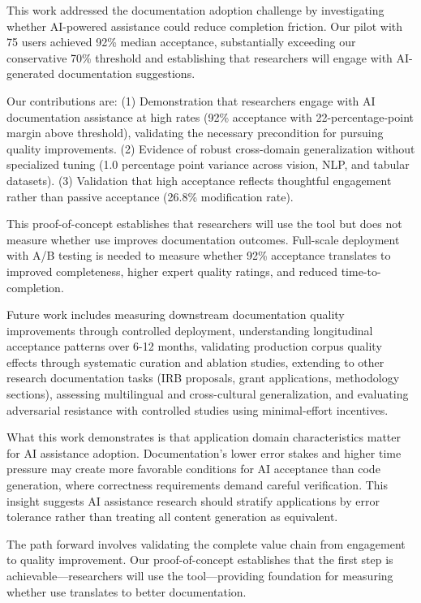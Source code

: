 
This work addressed the documentation adoption challenge by investigating whether AI-powered assistance could reduce completion friction. Our pilot with 75 users achieved 92\% median acceptance, substantially exceeding our conservative 70\% threshold and establishing that researchers will engage with AI-generated documentation suggestions.

Our contributions are: (1) Demonstration that researchers engage with AI documentation assistance at high rates (92\% acceptance with 22-percentage-point margin above threshold), validating the necessary precondition for pursuing quality improvements. (2) Evidence of robust cross-domain generalization without specialized tuning (1.0 percentage point variance across vision, NLP, and tabular datasets). (3) Validation that high acceptance reflects thoughtful engagement rather than passive acceptance (26.8\% modification rate).

This proof-of-concept establishes that researchers will use the tool but does not measure whether use improves documentation outcomes. Full-scale deployment with A/B testing is needed to measure whether 92\% acceptance translates to improved completeness, higher expert quality ratings, and reduced time-to-completion.

Future work includes measuring downstream documentation quality improvements through controlled deployment, understanding longitudinal acceptance patterns over 6-12 months, validating production corpus quality effects through systematic curation and ablation studies, extending to other research documentation tasks (IRB proposals, grant applications, methodology sections), assessing multilingual and cross-cultural generalization, and evaluating adversarial resistance with controlled studies using minimal-effort incentives.

What this work demonstrates is that application domain characteristics matter for AI assistance adoption. Documentation's lower error stakes and higher time pressure may create more favorable conditions for AI acceptance than code generation, where correctness requirements demand careful verification. This insight suggests AI assistance research should stratify applications by error tolerance rather than treating all content generation as equivalent.

The path forward involves validating the complete value chain from engagement to quality improvement. Our proof-of-concept establishes that the first step is achievable—researchers will use the tool—providing foundation for measuring whether use translates to better documentation.
